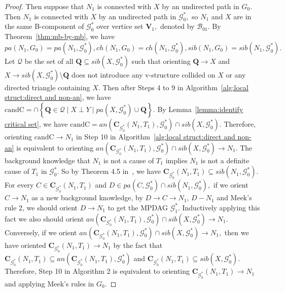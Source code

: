 \documentclass{article}
\begin{document}
\begin{proof}
Then suppose that $N_1$ is connected with $X$ by an undirected path in $G_0.$ Then $N_1$ is connected with $X$ by an undirected path in $\mathcal{G}^*_0,$ so $N_1$ and $X$ are in the same B-component of $\mathcal{G}^*_0$ over vertice set $\mathbf{V}_1,$ denoted by $\mathcal{B}_{01}.$ By Theorem~\ref{thm:mb-by-mb}, we have $pa(N_1,G_0)=pa(N_1,\mathcal{G}^*_0), ch(N_1,G_0)=ch(N_1,\mathcal{G}^*_0), sib(N_1,G_0)=sib(N_1,\mathcal{G}^*_0).$ Let $\mathcal{Q}$ be the set of all $\mathbf{Q}\subseteq sib(X,\mathcal{G}^*_0)$ such that orienting $\mathbf{Q}\to X$ and $X\to sib(X,\mathcal{G}^*_0)\setminus \mathbf{Q}$ does not introduce any v-structure collided on $X$ or any directed triangle containing $X.$ Then after Steps 4 to 9 in Algorithm~\ref{alg:local struct:direct and non-an}, we have $\mathrm{candC}=\cap \left\{ \mathbf{Q}\in \mathcal{Q} \mid X\perp Y \mid pa(X,\mathcal{G}^*_0)\cup \mathbf{Q} \right\}.$ By Lemma~\ref{lemma:identify critical set}, we have $\mathrm{candC}=an(\mathbf{C}_{\mathcal{G}^*_0}(N_1,T_1),\mathcal{G}^*_0)\cap sib(X,\mathcal{G}^*_0).$ Therefore, orienting $\mathrm{candC} \to N_1$ in Step 10 in Algorithm~\ref{alg:local struct:direct and non-an} is equivalent to orienting $an(\mathbf{C}_{\mathcal{G}^*_0}(N_1,T_1),\mathcal{G}^*_0)\cap sib(X,\mathcal{G}^*_0) \to N_1.$ The background knowledge that $N_1$ is not a cause of $T_1$ implies $N_1$ is not a definite cause of $T_1$ in $\mathcal{G}^*_0.$ So by Theorem 4.5 in~\citet{zuo2022counterfactual}, we have $\mathbf{C}_{\mathcal{G}^*_0}(N_1,T_1)\subseteq sib(N_1,\mathcal{G}^*_0).$ For every $C\in \mathbf{C}_{\mathcal{G}^*_0}(N_1,T_1)$ and $D\in pa(C,\mathcal{G}^*_0)\cap sib(N_1,\mathcal{G}^*_0),$ if we orient $C\to N_1$ as a new background knowledge, by $D\to C\to N_1$, $D-N_1$ and Meek's rule 2, we should orient $D\to N_1$ to get the MPDAG $\mathcal{G}^*_1.$ Inductively applying this fact we also should orient $an(\mathbf{C}_{\mathcal{G}^*_0}(N_1,T_1),\mathcal{G}^*_0)\cap sib(X,\mathcal{G}^*_0) \to N_1.$ Conversely, if we orient $an(\mathbf{C}_{\mathcal{G}^*_0}(N_1,T_1),\mathcal{G}^*_0)\cap sib(X,\mathcal{G}^*_0) \to N_1,$ then we have oriented $\mathbf{C}_{\mathcal{G}^*_0}(N_1,T_1)\to N_1$ by the fact that $\mathbf{C}_{\mathcal{G}^*_0}(N_1,T_1)\subseteq an(\mathbf{C}_{\mathcal{G}^*_0}(N_1,T_1),\mathcal{G}^*_0)$ and $\mathbf{C}_{\mathcal{G}^*_0}(N_1,T_1)\subseteq sib(X,\mathcal{G}^*_0).$ Therefore, Step 10 in Algorithm 2 is equivalent to orienting $\mathbf{C}_{\mathcal{G}^*_0}(N_1,T_1)\to N_1$ and applying Meek's rules in $G_0.$


\end{proof}
\end{document}
